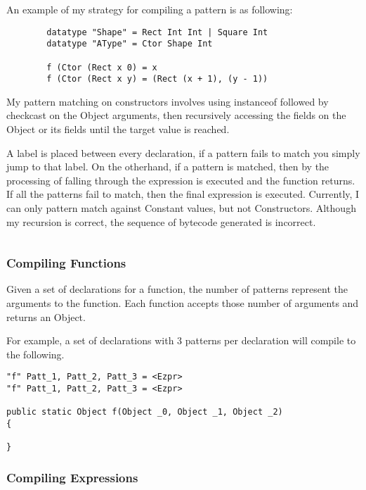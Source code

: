 \documentclass{article}
\begin{document}
An example of my strategy for compiling a pattern is as following:

\begin{verbatim}
        datatype "Shape" = Rect Int Int | Square Int
        datatype "AType" = Ctor Shape Int
        
        f (Ctor (Rect x 0) = x
        f (Ctor (Rect x y) = (Rect (x + 1), (y - 1))
\end{verbatim}

My pattern matching on constructors involves using instanceof followed by checkcast on the Object arguments, then recursively accessing the fields on the Object or its fields until the target value is reached.

A label is placed between every declaration, if a pattern fails to match you simply jump to that label. On the otherhand, if a pattern is matched, then by the processing of falling through the expression is executed and the function returns. If all the patterns fail to match, then the final expression is executed. Currently, I can only pattern match against Constant values, but not Constructors. Although my recursion is correct, the sequence of bytecode generated is incorrect.

\begin{verbatim}

\end{verbatim}

\subsubsection{Compiling Functions}

Given a set of declarations for a function, the number of patterns represent the arguments to the function. Each function accepts those number of arguments and returns an Object.

For example, a set of declarations with 3 patterns per declaration will compile to the following.

\begin{verbatim}
"f" Patt_1, Patt_2, Patt_3 = <Ezpr>
"f" Patt_1, Patt_2, Patt_3 = <Ezpr>

public static Object f(Object _0, Object _1, Object _2)
{

}

\end{verbatim}

\subsubsection{Compiling Expressions}
\end{document}

